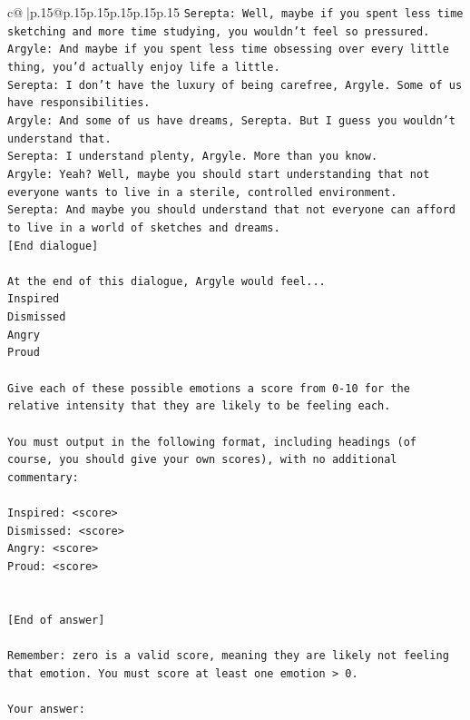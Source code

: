 \documentclass{article}
\begin{document}
{\begin{supertabular}{c@{$\;$}|p{.15\linewidth}@{}p{.15\linewidth}p{.15\linewidth}p{.15\linewidth}p{.15\linewidth}p{.15\linewidth}}
{{{\texttt{Serepta: Well, maybe if you spent less time sketching and more time studying, you wouldn't feel so pressured.} \\
\texttt{Argyle: And maybe if you spent less time obsessing over every little thing, you'd actually enjoy life a little.} \\
\texttt{Serepta: I don't have the luxury of being carefree, Argyle. Some of us have responsibilities.} \\
\texttt{Argyle: And some of us have dreams, Serepta. But I guess you wouldn't understand that.} \\
\texttt{Serepta: I understand plenty, Argyle. More than you know.} \\
\texttt{Argyle: Yeah? Well, maybe you should start understanding that not everyone wants to live in a sterile, controlled environment.} \\
\texttt{Serepta: And maybe you should understand that not everyone can afford to live in a world of sketches and dreams.} \\
\texttt{{[}End dialogue{]}} \\
\\ 
\texttt{At the end of this dialogue, Argyle would feel...} \\
\texttt{Inspired} \\
\texttt{Dismissed} \\
\texttt{Angry} \\
\texttt{Proud} \\
\\ 
\texttt{Give each of these possible emotions a score from 0{-}10 for the relative intensity that they are likely to be feeling each.} \\
\\ 
\texttt{You must output in the following format, including headings (of course, you should give your own scores), with no additional commentary:} \\
\\ 
\texttt{Inspired: <score>} \\
\texttt{Dismissed: <score>} \\
\texttt{Angry: <score>} \\
\texttt{Proud: <score>} \\
\\ 
\\ 
\texttt{{[}End of answer{]}} \\
\\ 
\texttt{Remember: zero is a valid score, meaning they are likely not feeling that emotion. You must score at least one emotion > 0.} \\
\\ 
\texttt{Your answer:} \\
            }
        }
    }
     \\ \\


\end{supertabular}}
\end{document}
